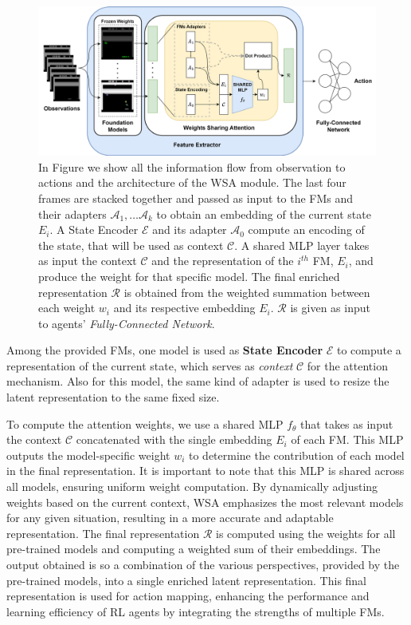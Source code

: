 \begin{figure}[ht]
    \begin{center}
        \includegraphics[width=1\textwidth]{images/main_architecture2}
    \end{center}
    \caption{In Figure we show all the information flow from observation to actions and the architecture of the WSA module. The last four frames are stacked together and passed as input to the FMs and their adapters $\mathcal{A}_1, \dots \mathcal{A}_k$ to obtain an embedding of the current state $E_i$. A State Encoder $\mathcal{E}$ and its adapter $\mathcal{A}_0$ compute an encoding of the state, that will be used as context $\mathcal{C}$. A shared MLP layer takes as input the context $\mathcal{C}$ and the representation of the $i^{th}$ FM, $E_i$, and produce the weight for that specific model. The final enriched representation $\mathcal{R}$ is obtained from the weighted summation between each weight $w_i$ and its respective embedding $E_i$. $\mathcal{R}$ is given as input to agents' \textit{Fully-Connected Network}.}
    \label{fig:main_architecture}
\end{figure}


Among the provided FMs, one model is used as \textbf{State Encoder} $\mathcal{E}$ to compute a representation of the current state, which serves as \textit{context} $\mathcal{C}$ for the attention mechanism.
Also for this model, the same kind of adapter is used to resize the latent representation to the same fixed size.


To compute the attention weights, we use a shared MLP $f_\theta$ that takes as input the context $\mathcal{C}$ concatenated with the single embedding $E_i$ of each FM\@.
This MLP outputs the model-specific weight $w_i$ to determine the contribution of each model in the final representation.
It is important to note that this MLP is shared across all models, ensuring uniform weight computation.
By dynamically adjusting weights based on the current context, WSA emphasizes the most relevant models for any given situation, resulting in a more accurate and adaptable representation.
The final representation $\mathcal{R}$ is computed using the weights for all pre-trained models and computing a weighted sum of their embeddings.
The output obtained is so a combination of the various perspectives, provided by the pre-trained models, into a single enriched latent representation.
This final representation is used for action mapping, enhancing the performance and learning efficiency of RL agents by integrating the strengths of multiple FMs.


